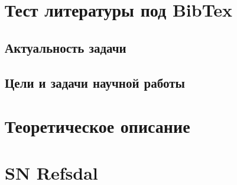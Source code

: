 \section{Тест литературы под BibTex}
    \cite{gravlensbook}
    \cite{kelly2014}
    \cite{treu2015}
    \cite{rodney2016}
    \cite{gl_all}
    \cite{pierelrodney2019}
    \cite{dobler2015}
    \cite{doblerkeeton2006}
    \cite{refsdalstabell1991}
    \cite{refsdal1964}
    \cite{narbart}
    \cite{wambsganss1999}
    \cite{shwamb2002}
    \cite{schneider1992}
    \cite{distance_measures}
    \cite{goobar2017}
    \cite{holicow}
    \cite{razmer}
    \cite{kawamataoguri}
    \cite{schechter2014}
    
    \subsection{Актуальность задачи}
        
    
    \subsection{Цели и задачи научной работы}
        
    
    \section{Теоретическое описание}
   
        
   
    \section{SN Refsdal}
        
   
   